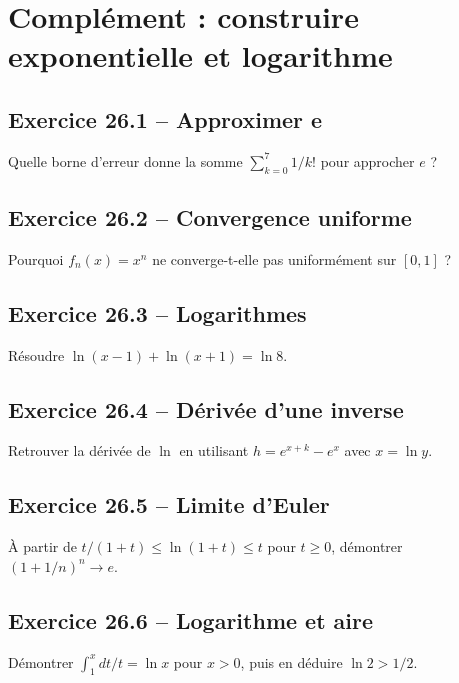 \chapter{Complément : construire exponentielle et logarithme}
\section*{Exercice 26.1 -- Approximer e}
Quelle borne d'erreur donne la somme $\sum_{k=0}^7 1/k!$ pour approcher $e$ ?

\section*{Exercice 26.2 -- Convergence uniforme}
Pourquoi $f_n(x)=x^n$ ne converge-t-elle pas uniformément sur $[0,1]$ ?

\section*{Exercice 26.3 -- Logarithmes}
Résoudre $\ln(x-1)+\ln(x+1)=\ln8$.

\section*{Exercice 26.4 -- Dérivée d'une inverse}
Retrouver la dérivée de $\ln$ en utilisant $h=e^{x+k}-e^x$ avec $x=\ln y$.

\section*{Exercice 26.5 -- Limite d'Euler}
À partir de $t/(1+t)\le\ln(1+t)\le t$ pour $t\ge0$, démontrer $(1+1/n)^n\to e$.

\section*{Exercice 26.6 -- Logarithme et aire}
Démontrer $\int_1^xdt/t=\ln x$ pour $x>0$, puis en déduire $\ln2>1/2$.
